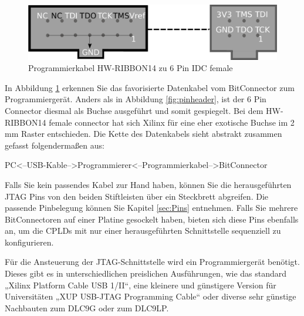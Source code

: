 \documentclass{article}
\begin{document}
\begin{figure}[!h]
	\centering
	\includegraphics[width=0.9\linewidth]{Figures/data_cable}
	\caption{Programmierkabel HW-RIBBON14 zu 6 Pin IDC female}
	\label{fig:data_cable}
\end{figure}

In Abbildung \ref{fig:data_cable} erkennen Sie das favorisierte Datenkabel vom BitConnector zum Programmiergerät. Anders als in Abbildung \ref{fig:pinheader}, ist der 6 Pin Connector diesmal als Buchse ausgeführt und somit gespiegelt. Bei dem HW-RIBBON14 female connector hat sich Xilinx für eine eher exotische Buchse im 2 mm Raster entschieden. Die Kette des Datenkabels sieht abstrakt zusammen gefasst folgendermaßen aus:
\vspace{0.5cm}
\begin{center}
	PC<--USB-Kable-->Programmierer<--Programmierkabel-->BitConnector
\end{center}

\vspace{0.5cm}

Falls Sie kein passendes Kabel zur Hand haben, können Sie die herausgeführten JTAG Pins von den beiden Stiftleisten über ein Steckbrett abgreifen. Die passende Pinbelegung können Sie Kapitel \ref{sec:Pins} entnehmen.
Falls Sie mehrere BitConnectoren auf einer Platine gesockelt haben, bieten sich diese Pins ebenfalls an, um die CPLDs mit nur einer herausgeführten Schnittstelle sequenziell zu konfigurieren.


Für die Ansteuerung der JTAG-Schnittstelle wird ein Programmiergerät benötigt. Dieses gibt es in unterschiedlichen preislichen Ausführungen, wie das standard „Xilinx Platform Cable USB 1/II“, eine kleinere und günstigere Version für Universitäten „XUP USB-JTAG Programming Cable“ oder diverse sehr günstige Nachbauten zum DLC9G oder zum DLC9LP. 





\newpage
\printbibliography
\end{document}
